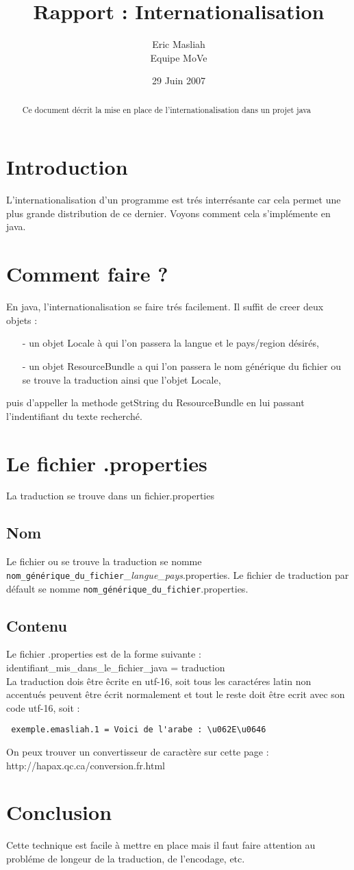\documentclass[a4paper,10pt]{article}
\title{Rapport : Internationalisation}
\author{Eric Masliah\\
Equipe MoVe}
\date{29 Juin 2007}
\begin{document}
\maketitle

\begin{abstract}
Ce document décrit la mise en place de l'internationalisation dans un projet java
\end{abstract}


\section{Introduction}
L'internationalisation d'un programme est trés interrésante car cela permet une plus grande distribution de ce dernier. Voyons comment cela s'implémente en java.

\section{Comment faire ?}
En java, l'internationalisation se faire trés facilement. Il suffit de creer deux objets :
\begin{itemize}
\item[-] un objet Locale à qui l'on passera la langue et le pays/region désirés,
\item[-] un objet ResourceBundle a qui l'on passera le nom générique du fichier ou se trouve la traduction ainsi que l'objet Locale,
\end{itemize}
puis d'appeller la methode getString du ResourceBundle en lui passant l'indentifiant du texte recherché.

\section{Le fichier .properties}
La traduction se trouve dans un fichier.properties

\subsection{Nom}
Le fichier ou se trouve la traduction se nomme 
\texttt{nom\_générique\_du\_fichier}\_\textit{langue}\_\textit{pays}.properties. Le fichier de traduction par défault se nomme \texttt{nom\_générique\_du\_fichier}.properties.

\subsection{Contenu}
Le fichier .properties est de la forme suivante :\\
identifiant\_mis\_dans\_le\_fichier\_java = traduction\\
La traduction dois être êcrite en utf-16, soit tous les caractéres latin non accentués peuvent être écrit normalement et tout le reste doit être ecrit avec son code utf-16, soit :
\begin{verbatim}
 exemple.emasliah.1 = Voici de l'arabe : \u062E\u0646
\end{verbatim}
On peux trouver un convertisseur de caractère sur cette page :  http://hapax.qc.ca/conversion.fr.html

\section{Conclusion}
Cette technique est facile à mettre en place mais il faut faire attention au probléme de longeur de la traduction, de l'encodage, etc.
\end{document}

